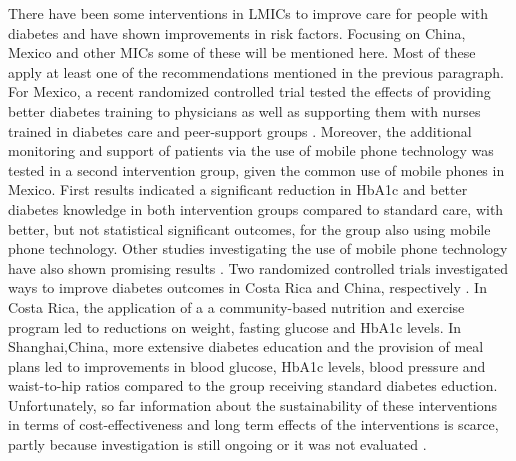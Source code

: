 There have been some interventions in \acp{LMIC} to improve care for people with diabetes and have shown improvements in risk factors. Focusing on China, Mexico and other \acp{MIC} some of these will be mentioned here. Most of these apply at least one of the recommendations mentioned in the previous paragraph. For Mexico, a recent randomized controlled trial tested the effects of providing better diabetes training to physicians as well as supporting them with nurses trained in diabetes care and peer-support groups \parencite{Contreras2016}. Moreover, the additional monitoring and support of patients via the use of mobile phone technology was tested in a second intervention group, given the common use of mobile phones in Mexico. First results indicated a significant reduction in \ac{HbA1c} and better diabetes knowledge in both intervention groups compared to standard care, with better, but not statistical significant outcomes, for the group also using mobile phone technology. Other studies investigating the use of mobile phone technology have also shown promising results \parencite{Singh2016}. Two randomized controlled trials investigated ways to improve diabetes outcomes in Costa Rica and China, respectively \parencite{Goldhaber-Fiebert2003a,Sun2008}. In Costa Rica, the application of a a community-based nutrition and exercise program led to reductions on weight, fasting glucose and \ac{HbA1c} levels. In Shanghai,China, more extensive diabetes education and the provision of meal plans led to improvements in blood glucose, \ac{HbA1c} levels, blood pressure and waist-to-hip ratios compared to the group receiving standard diabetes eduction.  Unfortunately, so far information about the sustainability of these interventions in terms of cost-effectiveness and long term effects of the interventions is scarce, partly because investigation is still ongoing \parencite{Contreras2016} or it was not evaluated \parencite{Singh2016}.


